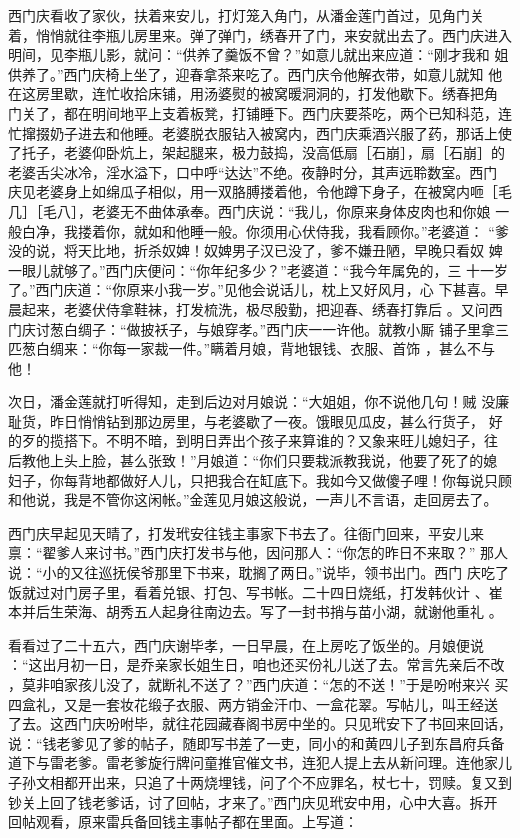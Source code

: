 西门庆看收了家伙，扶着来安儿，打灯笼入角门，从潘金莲门首过，见角门关
着，悄悄就往李瓶儿房里来。弹了弹门，绣春开了门，来安就出去了。西门庆进入
明间，见李瓶儿影，就问：“供养了羹饭不曾？”如意儿就出来应道：“刚才我和
姐供养了。”西门庆椅上坐了，迎春拿茶来吃了。西门庆令他解衣带，如意儿就知
他在这房里歇，连忙收拾床铺，用汤婆熨的被窝暖洞洞的，打发他歇下。绣春把角
门关了，都在明间地平上支着板凳，打铺睡下。西门庆要茶吃，两个已知科范，连
忙撺掇奶子进去和他睡。老婆脱衣服钻入被窝内，西门庆乘酒兴服了药，那话上使
了托子，老婆仰卧炕上，架起腿来，极力鼓捣，没高低扇［石崩］，扇［石崩］的
老婆舌尖冰冷，淫水溢下，口中呼“达达”不绝。夜静时分，其声远聆数室。西门
庆见老婆身上如绵瓜子相似，用一双胳膊搂着他，令他蹲下身子，在被窝内咂［毛
几］［毛八］，老婆无不曲体承奉。西门庆说：“我儿，你原来身体皮肉也和你娘
一般白净，我搂着你，就如和他睡一般。你须用心伏侍我，我看顾你。”老婆道：
“爹没的说，将天比地，折杀奴婢！奴婢男子汉已没了，爹不嫌丑陋，早晚只看奴
婢一眼儿就够了。”西门庆便问：“你年纪多少？”老婆道：“我今年属免的，三
十一岁了。”西门庆道：“你原来小我一岁。”见他会说话儿，枕上又好风月，心
下甚喜。早晨起来，老婆伏侍拿鞋袜，打发梳洗，极尽殷勤，把迎春、绣春打靠后
。又问西门庆讨葱白绸子：“做披袄子，与娘穿孝。”西门庆一一许他。就教小厮
铺子里拿三匹葱白绸来：“你每一家裁一件。”瞒着月娘，背地银钱、衣服、首饰
，甚么不与他！

次日，潘金莲就打听得知，走到后边对月娘说：“大姐姐，你不说他几句！贼
没廉耻货，昨日悄悄钻到那边房里，与老婆歇了一夜。饿眼见瓜皮，甚么行货子，
好的歹的揽搭下。不明不暗，到明日弄出个孩子来算谁的？又象来旺儿媳妇子，往
后教他上头上脸，甚么张致！”月娘道：“你们只要栽派教我说，他要了死了的媳
妇子，你每背地都做好人儿，只把我合在缸底下。我如今又做傻子哩！你每说只顾
和他说，我是不管你这闲帐。”金莲见月娘这般说，一声儿不言语，走回房去了。

西门庆早起见天晴了，打发玳安往钱主事家下书去了。往衙门回来，平安儿来
禀：“翟爹人来讨书。”西门庆打发书与他，因问那人：“你怎的昨日不来取？”
那人说：“小的又往巡抚侯爷那里下书来，耽搁了两日。”说毕，领书出门。西门
庆吃了饭就过对门房子里，看着兑银、打包、写书帐。二十四日烧纸，打发韩伙计
、崔本并后生荣海、胡秀五人起身往南边去。写了一封书捎与苗小湖，就谢他重礼
。

看看过了二十五六，西门庆谢毕孝，一日早晨，在上房吃了饭坐的。月娘便说
：“这出月初一日，是乔亲家长姐生日，咱也还买份礼儿送了去。常言先亲后不改
，莫非咱家孩儿没了，就断礼不送了？”西门庆道：“怎的不送！”于是吩咐来兴
买四盒礼，又是一套妆花缎子衣服、两方销金汗巾、一盒花翠。写帖儿，叫王经送
了去。这西门庆吩咐毕，就往花园藏春阁书房中坐的。只见玳安下了书回来回话，
说：“钱老爹见了爹的帖子，随即写书差了一吏，同小的和黄四儿子到东昌府兵备
道下与雷老爹。雷老爹旋行牌问童推官催文书，连犯人提上去从新问理。连他家儿
子孙文相都开出来，只追了十两烧埋钱，问了个不应罪名，杖七十，罚赎。复又到
钞关上回了钱老爹话，讨了回帖，才来了。”西门庆见玳安中用，心中大喜。拆开
回帖观看，原来雷兵备回钱主事帖子都在里面。上写道：

